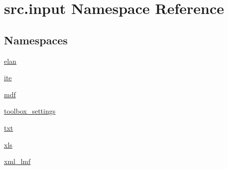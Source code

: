 \hypertarget{namespacesrc_1_1input}{\section{src.\+input Namespace Reference}
\label{namespacesrc_1_1input}
}
\subsection*{Namespaces}
\begin{DoxyCompactItemize}
\item 
 \hyperlink{namespacesrc_1_1input_1_1elan}{elan}
\item 
 \hyperlink{namespacesrc_1_1input_1_1ite}{ite}
\item 
 \hyperlink{namespacesrc_1_1input_1_1mdf}{mdf}
\item 
 \hyperlink{namespacesrc_1_1input_1_1toolbox__settings}{toolbox\+\_\+settings}
\item 
 \hyperlink{namespacesrc_1_1input_1_1txt}{txt}
\item 
 \hyperlink{namespacesrc_1_1input_1_1xls}{xls}
\item 
 \hyperlink{namespacesrc_1_1input_1_1xml__lmf}{xml\+\_\+lmf}
\end{DoxyCompactItemize}
